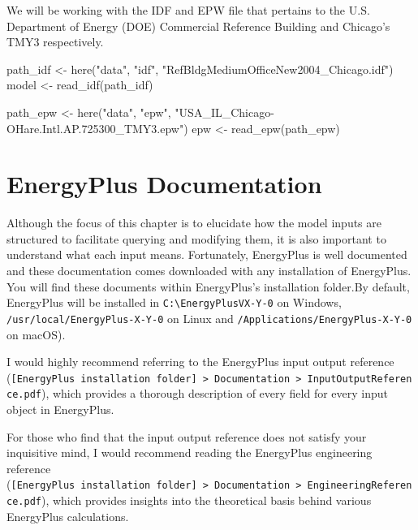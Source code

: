 \documentclass[
]{book}
\newenvironment{Shaded}{\begin{snugshade}}{\end{snugshade}}
\newcommand{\FunctionTok}[1]{\textcolor[rgb]{0.00,0.00,0.00}{#1}}
\newcommand{\NormalTok}[1]{#1}
\newcommand{\OtherTok}[1]{\textcolor[rgb]{0.56,0.35,0.01}{#1}}
\newcommand{\StringTok}[1]{\textcolor[rgb]{0.31,0.60,0.02}{#1}}
\begin{document}
We will be working with the IDF and EPW file that pertains to the U.S. Department of Energy (DOE) Commercial Reference Building and Chicago's TMY3 respectively.

\begin{Shaded}
\begin{Highlighting}[]
\NormalTok{path\_idf }\OtherTok{\textless{}{-}} \FunctionTok{here}\NormalTok{(}\StringTok{"data"}\NormalTok{, }\StringTok{"idf"}\NormalTok{, }\StringTok{"RefBldgMediumOfficeNew2004\_Chicago.idf"}\NormalTok{)}
\NormalTok{model }\OtherTok{\textless{}{-}} \FunctionTok{read\_idf}\NormalTok{(path\_idf)}

\NormalTok{path\_epw }\OtherTok{\textless{}{-}} \FunctionTok{here}\NormalTok{(}\StringTok{"data"}\NormalTok{, }\StringTok{"epw"}\NormalTok{, }\StringTok{"USA\_IL\_Chicago{-}OHare.Intl.AP.725300\_TMY3.epw"}\NormalTok{)}
\NormalTok{epw }\OtherTok{\textless{}{-}} \FunctionTok{read\_epw}\NormalTok{(path\_epw)}
\end{Highlighting}
\end{Shaded}

\hypertarget{energyplus-documentation}{%
\section{EnergyPlus Documentation}\label{energyplus-documentation}}

Although the focus of this chapter is to elucidate how the model inputs are structured to facilitate querying and modifying them, it is also important to understand what each input means. Fortunately, EnergyPlus is well documented and these documentation comes downloaded with any installation of EnergyPlus. You will find these documents within EnergyPlus's installation folder.By default, EnergyPlus will be installed in \texttt{C:\textbackslash{}EnergyPlusVX-Y-0} on Windows, \texttt{/usr/local/EnergyPlus-X-Y-0} on Linux and \texttt{/Applications/EnergyPlus-X-Y-0} on macOS).

I would highly recommend referring to the EnergyPlus input output reference (\texttt{{[}EnergyPlus\ installation\ folder{]}\ \textgreater{}\ Documentation\ \textgreater{}\ InputOutputReference.pdf}), which provides a thorough description of every field for every input object in EnergyPlus.

For those who find that the input output reference does not satisfy your inquisitive mind, I would recommend reading the EnergyPlus engineering reference (\texttt{{[}EnergyPlus\ installation\ folder{]}\ \textgreater{}\ Documentation\ \textgreater{}\ EngineeringReference.pdf}), which provides insights into the theoretical basis behind various EnergyPlus calculations.
\end{document}
